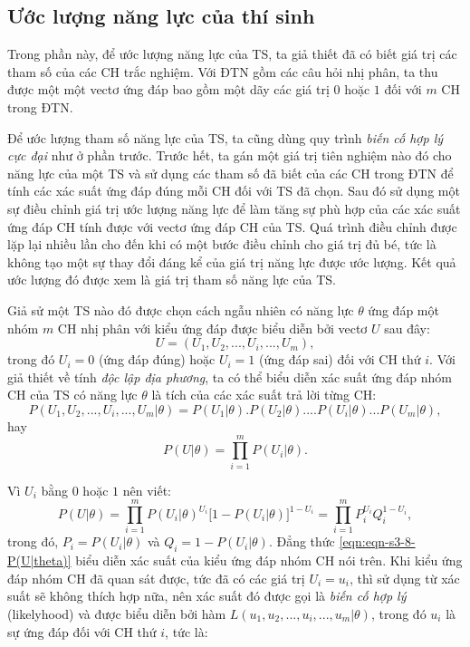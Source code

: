 \subsection{Ước lượng năng lực của thí sinh}
Trong phần này, để ước lượng năng lực của TS, ta giả thiết đã có biết giá trị các tham số của các CH trắc nghiệm. Với ĐTN gồm các câu hỏi nhị phân, ta thu được một một vectơ ứng đáp bao gồm một dãy các giá trị $0$ hoặc $1$ đối với $m$ CH trong ĐTN.\par
Để ước lượng tham số năng lực của TS, ta cũng dùng quy trình \textit{biến cố hợp lý cực đại} như ở phần trước. Trước hết, ta gán một giá trị tiên nghiệm nào đó cho năng lực của một TS và sử dụng các tham số đã biết của các CH trong ĐTN để tính các xác suất ứng đáp đúng mỗi CH đối với TS đã chọn. Sau đó sử dụng một sự điều chỉnh giá trị ước lượng năng lực để làm tăng sự phù hợp của các xác suất ứng đáp CH tính được với vectơ ứng đáp CH của TS. Quá trình điều chỉnh được lặp lại nhiều lần cho đến khi có một bước điều chỉnh cho giá trị đủ bé, tức là không tạo một sự thay đổi đáng kể của giá trị năng lực được ước lượng. Kết quả ước lượng đó được xem là giá trị tham số năng lực của TS.\par
Giả sử một TS nào đó được chọn cách ngẫu nhiên có năng lực $\theta$ ứng đáp một nhóm $m$ CH nhị phân với kiểu ứng đáp được biểu diễn bởi vectơ $U$ sau đây: $$U=\left(U_1,U_2,...,U_i,...,U_m\right),$$
trong đó $U_i=0$ (ứng đáp đúng) hoặc $U_i=1$ (ứng đáp sai) đối với CH thứ $i$. Với giả thiết về tính \textit{độc lập địa phương}, ta có thể biểu diễn xác suất ứng đáp nhóm CH của TS có năng lực $\theta$ là tích của các xác suất trả lời từng CH: $$P\left(U_1,U_2,...,U_i,...,U_m|\theta\right)=P(U_1|\theta).P(U_2|\theta)....P(U_i|\theta)...P(U_m|\theta),$$ hay $$P(U|\theta)=\prod_{i=1}^{m}P\left(U_i|\theta\right).$$\par
Vì $U_i$ bằng $0$ hoặc $1$ nên viết:
\begin{equation}\label{eqn:eqn-s3-8-P(U|theta)}
	P(U|\theta)=\prod_{i=1}^{m}P(U_i|\theta)^{U_i}\big[1-P(U_i|\theta)\big]^{1-U_i}=\prod_{i=1}^{m}P_i^{U_i}Q_i^{1-U_i},
\end{equation}
trong đó, $P_i=P(U_i|\theta)$ và $Q_i=1-P(U_i|\theta)$.
Đẳng thức \ref{eqn:eqn-s3-8-P(U|theta)} biểu diễn xác suất của kiểu ứng đáp nhóm CH nói trên. Khi kiểu ứng đáp nhóm CH đã quan sát được, tức đã có các giá trị $U_i=u_i$, thì sử dụng từ xác suất sẽ không thích hợp nữa, nên xác suất đó được gọi là \textit{biến cố hợp lý} (likelyhood) và được biểu diễn bởi hàm $L(u_1,u_2,...,u_i,...,u_m|\theta)$, trong đó $u_i$ là sự ứng đáp đối với CH thứ $i$, tức là:
